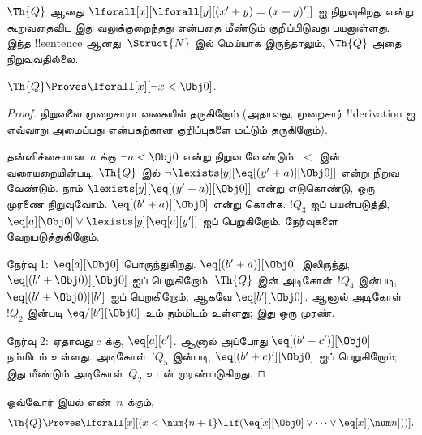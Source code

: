 \documentclass[../../../include/open-logic-section]{subfiles}
\begin{document}
$\Th{Q}$ ஆனது $\lforall[x][\lforall[y][(x' + y) = (x + y)']]$ ஐ
நிறுவுகிறது என்று கூறுவதைவிட இது வலுக்குறைந்தது என்பதை மீண்டும் குறிப்பிடுவது
பயனுள்ளது. இந்த !!{sentence} ஆனது~$\Struct{N}$ இல் மெய்யாக இருந்தாலும், $\Th{Q}$
அதை நிறுவுவதில்லை.

\begin{lem}
$\Th{Q} \Proves \lforall[x][\lnot x < \Obj 0]$.
\end{lem}

\begin{proof}
நிறுவலை முறைசாரா வகையில் தருகிறோம் (அதாவது, முறைசார் !!{derivation} ஐ
எவ்வாறு அமைப்பது என்பதற்கான குறிப்புகளை மட்டும் தருகிறோம்).

தன்னிச்சையான~$a$ க்கு $\lnot a < \Obj 0$ என்று நிறுவ வேண்டும். $<$ இன்
வரையறையின்படி, $\Th{Q}$ இல் $\lnot
\lexists[y][\eq[(y'+a)][\Obj 0]]$ என்று நிறுவ வேண்டும். நாம்
$\lexists[y][\eq[(y'+a)][\Obj 0]]$ என்று எடுகொண்டு, ஒரு முரணை
நிறுவுவோம். $\eq[(b'+a)][\Obj 0]$ என்று கொள்க. $!Q_3$ ஐப் பயன்படுத்தி,
$\eq[a][\Obj 0] \lor \lexists[y][\eq[a][y']]$ ஐப் பெறுகிறோம். நேர்வுகளை
வேறுபடுத்துகிறோம்.

நேர்வு 1: $\eq[a][\Obj 0]$ பொருந்துகிறது. $\eq[(b'+a)][\Obj 0]$
இலிருந்து, $\eq[(b' + \Obj 0)][\Obj 0]$ ஐப் பெறுகிறோம். $\Th{Q}$ இன்
அடிகோள்~$!Q_4$ இன்படி, $\eq[(b' + \Obj 0)][b']$ ஐப் பெறுகிறோம்;
ஆகவே $\eq[b'][\Obj 0]$. ஆனால் அடிகோள்~$!Q_2$ இன்படி
$\eq/[b'][\Obj 0]$ உம் நம்மிடம் உள்ளது; இது ஒரு முரண்.

நேர்வு 2: ஏதாவது $c$ க்கு, $\eq[a][c']$. ஆனால் அப்போது
$\eq[(b' + c')][\Obj 0]$ நம்மிடம் உள்ளது. அடிகோள்~$!Q_5$ இன்படி,
$\eq[(b' + c)'][\Obj 0]$ ஐப் பெறுகிறோம்; இது மீண்டும் அடிகோள்~$Q_2$
உடன் முரண்படுகிறது.
\end{proof}

\begin{lem}
ஒவ்வோர் இயல் எண்~$n$ க்கும்,
  \[
  \Th{Q} \Proves
  \lforall[x][(x < \num {n+1} \lif (\eq[x][\Obj 0] \lor \dots \lor
    \eq[x][\num n]))].
  \]
\end{lem}
\end{document}
